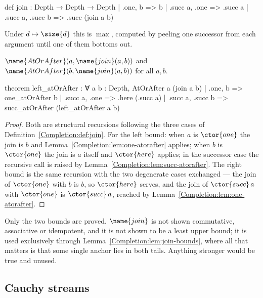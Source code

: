 \begin{leancode}
def join : Depth → Depth → Depth
  | .one, b => b
  | .succ a, .one => .succ a
  | .succ a, .succ b => .succ (join a b)
\end{leancode}

Under $d \mapsto \size{d}$ this is $\max$, computed by peeling one successor
from each argument until one of them bottoms out.

\begin{lemma}
\label{Completion:lem:join-bounds}
$\name{AtOrAfter}(a, \name{join}(a,b))$ and
$\name{AtOrAfter}(b, \name{join}(a,b))$ for all $a, b$.
\end{lemma}

\begin{leancode}
theorem left_atOrAfter : ∀ a b : Depth, AtOrAfter a (join a b)
  | .one, b => one_atOrAfter b
  | .succ a, .one => .here (.succ a)
  | .succ a, .succ b => succ_atOrAfter (left_atOrAfter a b)
\end{leancode}

\begin{proof}
Both are structural recursions following the three cases of
Definition~\ref{Completion:def:join}.  For the left bound: when $a$ is
$\ctor{one}$ the join is $b$ and Lemma~\ref{Completion:lem:one-atorafter}
applies; when $b$ is $\ctor{one}$ the join is $a$ itself and $\ctor{here}$
applies; in the successor case the recursive call is raised by
Lemma~\ref{Completion:lem:succ-atorafter}.  The right bound is the same
recursion with the two degenerate cases exchanged --- the join of $\ctor{one}$
with $b$ is $b$, so $\ctor{here}$ serves, and the join of $\ctor{succ}\,a$ with
$\ctor{one}$ is $\ctor{succ}\,a$, reached by
Lemma~\ref{Completion:lem:one-atorafter}.
\end{proof}

\begin{remark}\label{Completion:rem:join}
Only the two bounds are proved.  $\name{join}$ is not shown commutative,
associative or idempotent, and it is not shown to be a least upper bound; it
is used exclusively through Lemma~\ref{Completion:lem:join-bounds}, where all
that matters is that some single anchor lies in both tails.  Anything stronger
would be true and unused.
\end{remark}

\subsection{Cauchy streams}

